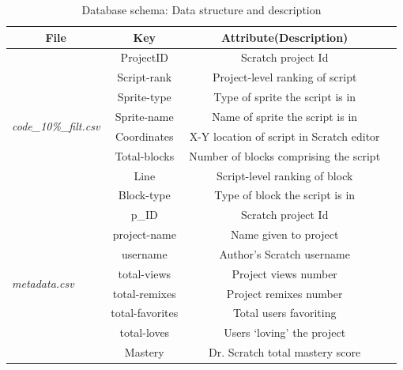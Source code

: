 \documentclass[a4paper,twocolumn,10pt]{article}
\begin{document}
\begin{table}
  \centering\renewcommand{\arraystretch}{1.2}
   \begin{tabular}{@{}lccc@{}}
    \toprule
    \multicolumn{1}{c}{\textbf{File}} & \textbf{Key} &\textbf{Attribute(Description)} \\
    \midrule
    \multirow{8}{*}{\textit{code\_10\%\_filt.csv}} & ProjectID & Scratch project Id \\
                & Script-rank & Project-level ranking of script \\
                & Sprite-type & Type of sprite the script is in\\
                & Sprite-name & Name of sprite the script is in\\
                & Coordinates & X-Y location of script in Scratch editor\\
                & Total-blocks & Number of blocks comprising the script \\
                & Line & Script-level ranking of block \\
                & Block-type & Type of block the script is in\\
    \hline
    \multirow{8}{*}{\textit{metadata.csv}} & p\_ID & Scratch project Id \\
                & project-name & Name given to project \\
                & username & Author’s Scratch username\\
                & total-views & Project views number \\
                & total-remixes & Project remixes number \\
                & total-favorites & Total users favoriting \\
                & total-loves & Users ‘loving’ the project \\
                & Mastery & Dr. Scratch total mastery score\\
    \bottomrule
    \end{tabular}
    \caption{Database schema: Data structure and description}
    \label{tab:schema}
\end{table}
\end{document}
